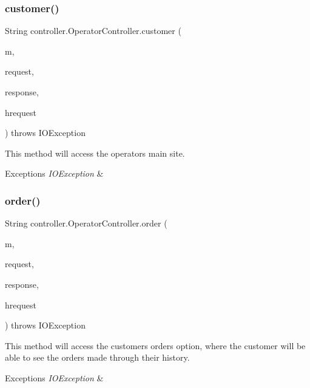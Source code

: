 \subsubsection{\texorpdfstring{customer()}{customer()}}
{\footnotesize\ttfamily String controller.\+Operator\+Controller.\+customer (\begin{DoxyParamCaption}\item[{Model}]{m,  }\item[{Web\+Request}]{request,  }\item[{Http\+Servlet\+Response}]{response,  }\item[{Http\+Servlet\+Request}]{hrequest }\end{DoxyParamCaption}) throws I\+O\+Exception\hspace{0.3cm}{\ttfamily [inline]}}

This method will access the operator\textquotesingle{}s main site. 
\begin{DoxyExceptions}{Exceptions}
{\em I\+O\+Exception} & \\
\hline
\end{DoxyExceptions}
\mbox{\label{classcontroller_1_1_operator_controller_a1fcb7b5bea154a09eef4db21632bcc60}} 
\subsubsection{\texorpdfstring{order()}{order()}}
{\footnotesize\ttfamily String controller.\+Operator\+Controller.\+order (\begin{DoxyParamCaption}\item[{Model}]{m,  }\item[{Web\+Request}]{request,  }\item[{Http\+Servlet\+Response}]{response,  }\item[{Http\+Servlet\+Request}]{hrequest }\end{DoxyParamCaption}) throws I\+O\+Exception\hspace{0.3cm}{\ttfamily [inline]}}

This method will access the customer\textquotesingle{}s \textquotesingle{}orders\textquotesingle{} option, where the customer will be able to see the orders made through their history. 
\begin{DoxyExceptions}{Exceptions}
{\em I\+O\+Exception} & \\
\hline
\end{DoxyExceptions}
\mbox{\label{classcontroller_1_1_operator_controller_a79b22da6d85dc475cd7973d4f9a47fc1}} 
